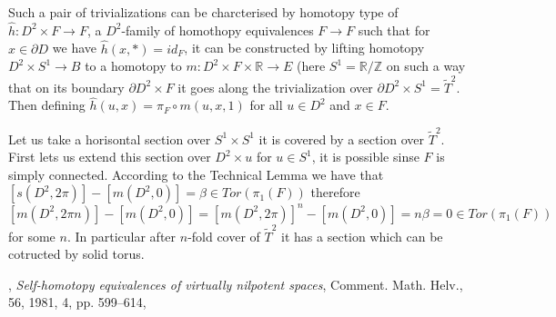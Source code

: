 \documentclass{article}
\def\RR{\mathbb{R}}%
\def\ZZ{\mathbb{Z}}%
\begin{document}
Such a pair of trivializations can be charcterised by homotopy type of $\hat h:D^2\times F\to F$, a
$D^2$-family of homothopy equivalences $F\to F$ such that for 
$x\in\partial D$ we have $\hat h(x,*)=id_F$, it can be constructed by lifting homotopy $D^2\times S^1\to B$ to a homotopy to $m:D^2\times F\times \RR\to E$ (here $S^1=\RR/\ZZ$ on such a way that on its boundary $\partial D^2\times F$ it goes along the trivialization over $\partial D^2\times S^1=\widetilde T^2$.
Then defining  $\hat h(u,x)=\pi_F\circ m(u,x,1)$ for all $u\in D^2$ and $x\in F$.

Let us take a horisontal section over $S^1\times S^1$ it is covered by a section over $\widetilde T^2$. 
First lets us extend this section over $D^2\times u$ for $u\in S^1$, it is possible sinse $F$ is simply connected.
 According to the Technical Lemma we have that $[s(D^2,2\pi)]-[m(D^2,0)]=\beta\in Tor(\pi_1(F))$
therefore  
$[m(D^2,2\pi n)]-[m(D^2,0)]=[m(D^2,2\pi)]^n-[m(D^2,0)]=n\beta=0\in Tor(\pi_1(F))$
for some $n$. In particular after $n$-fold cover of $\widetilde T^2$ it has a section which can be cotructed by solid torus.



\begin{thebibliography}{HMR75}
,
 \textit{Self-homotopy equivalences of virtually nilpotent spaces},
{Comment. Math. Helv.},
{56},
{1981},
{4},
pp. {599--614},
\end{thebibliography}
\end{document}
